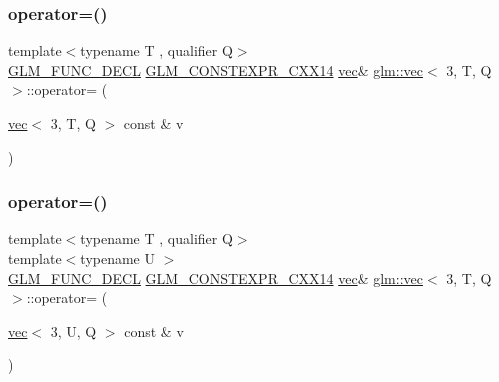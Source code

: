 \mbox{\label{structglm_1_1vec_3_013_00_01_t_00_01_q_01_4_ab955dba2c50085c9e1b3f6b0daa36fcc}} 
\subsubsection{\texorpdfstring{operator=()}{operator=()}\hspace{0.1cm}{\footnotesize\ttfamily [2/3]}}
{\footnotesize\ttfamily template$<$typename T , qualifier Q$>$ \\
\mbox{\hyperlink{setup_8hpp_ab2d052de21a70539923e9bcbf6e83a51}{G\+L\+M\+\_\+\+F\+U\+N\+C\+\_\+\+D\+E\+CL}} \mbox{\hyperlink{setup_8hpp_a4dd12abf5e1164bc57f3a34671d03844}{G\+L\+M\+\_\+\+C\+O\+N\+S\+T\+E\+X\+P\+R\+\_\+\+C\+X\+X14}} \mbox{\hyperlink{structglm_1_1vec}{vec}}\& \mbox{\hyperlink{structglm_1_1vec}{glm\+::vec}}$<$ 3, T, Q $>$\+::operator= (\begin{DoxyParamCaption}\item[{\mbox{\hyperlink{structglm_1_1vec}{vec}}$<$ 3, T, Q $>$ const \&}]{v }\end{DoxyParamCaption})}

\mbox{\label{structglm_1_1vec_3_013_00_01_t_00_01_q_01_4_a10cb43cfab9dbc66022f9bd5c121b694}} 
\subsubsection{\texorpdfstring{operator=()}{operator=()}\hspace{0.1cm}{\footnotesize\ttfamily [3/3]}}
{\footnotesize\ttfamily template$<$typename T , qualifier Q$>$ \\
template$<$typename U $>$ \\
\mbox{\hyperlink{setup_8hpp_ab2d052de21a70539923e9bcbf6e83a51}{G\+L\+M\+\_\+\+F\+U\+N\+C\+\_\+\+D\+E\+CL}} \mbox{\hyperlink{setup_8hpp_a4dd12abf5e1164bc57f3a34671d03844}{G\+L\+M\+\_\+\+C\+O\+N\+S\+T\+E\+X\+P\+R\+\_\+\+C\+X\+X14}} \mbox{\hyperlink{structglm_1_1vec}{vec}}\& \mbox{\hyperlink{structglm_1_1vec}{glm\+::vec}}$<$ 3, T, Q $>$\+::operator= (\begin{DoxyParamCaption}\item[{\mbox{\hyperlink{structglm_1_1vec}{vec}}$<$ 3, U, Q $>$ const \&}]{v }\end{DoxyParamCaption})}

